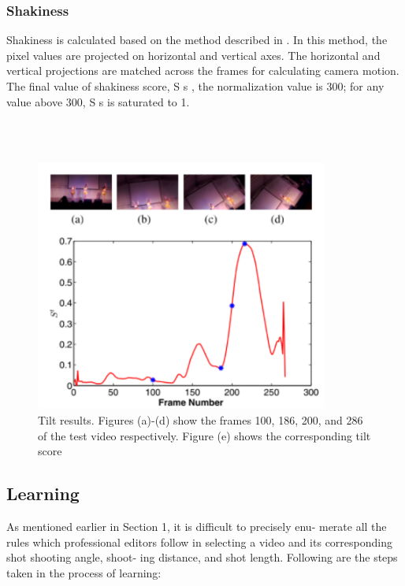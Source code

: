 \documentclass{sig-alternate}
\begin{document}
\subsubsection{Shakiness}Shakiness is calculated based on the method described in \cite{4}.
In this method, the pixel values are projected on horizontal and
vertical axes. The horizontal and vertical projections are matched
across the frames for calculating camera motion. The final value of shakiness
score, S s , the normalization value is 300;
for any value above 300, S s is saturated to 1.

\\\\
\begin{figure}
    \centering
    \includegraphics{img4.png}
    \caption{Tilt results. Figures (a)-(d) show the frames 100, 186,
200, and 286 of the test video respectively. Figure (e) shows the
corresponding tilt score}
    \label{fig:my_label}
\end{figure}


\subsection{Learning}
As mentioned earlier in Section 1, it is difficult to precisely enu-
merate all the rules which professional editors follow in selecting
a video and its corresponding shot shooting angle, shoot-
ing distance, and shot length. Following are the steps taken in the
process of learning:
\end{document}
